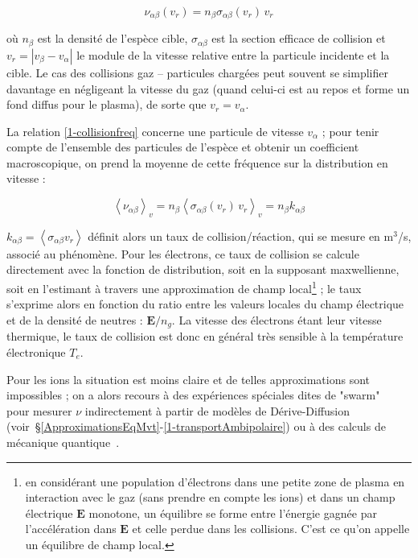 \begin{refsection}
\begin{equation}
\label{1-collisionfreq}
	\nu_{\alpha
	\beta}(v_r)=n_\beta\sigma_{\alpha
	\beta}(v_r)\,v_r
\end{equation}

où $n_\beta$ est la densité de l'espèce cible, $\sigma_{\alpha \beta}$ est la
section efficace de collision et $v_r=|v_\beta-v_\alpha|$ le module de
la vitesse relative entre la particule incidente et la cible. 
Le cas des collisions gaz -- particules chargées peut souvent se simplifier
davantage en négligeant la vitesse du gaz (quand celui-ci est au repos et forme
un fond diffus pour le plasma), de sorte que $v_r=v_\alpha$.

La relation \eqref{1-collisionfreq}
concerne une particule de vitesse $v_\alpha$ ; pour tenir compte de l'ensemble des particules
de l'espèce et obtenir un coefficient macroscopique, on prend la moyenne de
cette fréquence sur la distribution en vitesse :

\begin{equation}
\label{1-collisionfreqMacro}
	\left<\nu_{\alpha
	\beta}\right>_v=n_\beta\left<\sigma_{\alpha
	\beta}(v_r)\,v_r\right>_v=n_\beta k_{\alpha
	\beta}
\end{equation}

$k_{\alpha\beta}=\left<\sigma_{\alpha\beta}
v_r\right>$ définit alors un taux de collision/réaction, qui se mesure en
m$^{3}$/s, associé au phénomène. Pour les électrons, ce taux de collision se
calcule directement avec la fonction de distribution, soit en la supposant 
maxwellienne, soit en l'estimant à travers une approximation de
champ local\footnote{en considérant une population d'électrons dans une
petite zone de plasma en interaction avec le gaz (sans prendre en compte les ions) et
dans un champ électrique $\mathbf E$ monotone, un équilibre se forme entre
l'énergie gagnée par l'accélération dans $\mathbf E$ et celle perdue dans les
collisions. C'est ce qu'on appelle un équilibre de champ local.} ; le taux
s'exprime alors en fonction du ratio entre les valeurs locales du champ électrique et de la densité de neutres : $\mathbf E/n_g$.
La vitesse des électrons étant leur vitesse thermique, le taux
de collision est donc en général très sensible à la température électronique
$T_e$.

Pour les ions la situation est moins claire et
de telles approximations sont impossibles ; on a alors recours à des expériences spéciales dites de
"swarm"~\parencite{Phelps} pour mesurer $\nu$ indirectement à partir de
modèles de Dérive-Diffusion
(voir~\S\ref{ApproximationsEqMvt}-\ref{1-transportAmbipolaire}) ou à des calculs
de mécanique quantique~\parencite{raju}.


\end{refsection}
